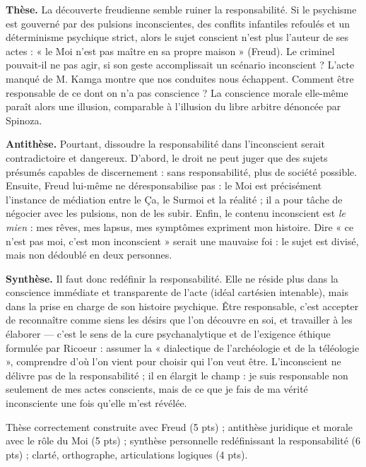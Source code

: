 \documentclass[11pt]{article}
\newcommand{\cle}[1]{{\popxbold\color{popdark}#1}}
\begin{document}
\begin{corrige}
\textbf{Thèse.} La découverte freudienne semble ruiner la responsabilité. Si le psychisme est gouverné par des pulsions inconscientes, des conflits infantiles refoulés et un déterminisme psychique strict, alors le sujet conscient n'est plus l'auteur de ses actes : « le Moi n'est pas maître en sa propre maison » (Freud). Le criminel pouvait-il ne pas agir, si son geste accomplissait un scénario inconscient ? L'acte manqué de M. Kamga montre que nos conduites nous échappent. Comment être responsable de ce dont on n'a pas conscience ? La conscience morale elle-même paraît alors une illusion, comparable à l'illusion du libre arbitre dénoncée par Spinoza.

\textbf{Antithèse.} Pourtant, dissoudre la responsabilité dans l'inconscient serait contradictoire et dangereux. D'abord, le droit ne peut juger que des sujets présumés capables de discernement : sans responsabilité, plus de société possible. Ensuite, Freud lui-même ne déresponsabilise pas : le \cle{Moi} est précisément l'instance de médiation entre le Ça, le Surmoi et la réalité ; il a pour tâche de négocier avec les pulsions, non de les subir. Enfin, le contenu inconscient est \emph{le mien} : mes rêves, mes lapsus, mes symptômes expriment mon histoire. Dire « ce n'est pas moi, c'est mon inconscient » serait une mauvaise foi : le sujet est divisé, mais non dédoublé en deux personnes.

\textbf{Synthèse.} Il faut donc redéfinir la responsabilité. Elle ne réside plus dans la conscience immédiate et transparente de l'acte (idéal cartésien intenable), mais dans la \cle{prise en charge} de son histoire psychique. Être responsable, c'est accepter de reconnaître comme siens les désirs que l'on découvre en soi, et travailler à les élaborer — c'est le sens de la cure psychanalytique et de l'exigence éthique formulée par Ricoeur : assumer la « dialectique de l'archéologie et de la téléologie », comprendre d'où l'on vient pour choisir qui l'on veut être. L'inconscient ne délivre pas de la responsabilité ; il en élargit le champ : je suis responsable non seulement de mes actes conscients, mais de ce que je fais de ma vérité inconsciente une fois qu'elle m'est révélée.
\end{corrige}

\begin{attention}
Thèse correctement construite avec Freud (5 pts) ; antithèse juridique et morale avec le rôle du Moi (5 pts) ; synthèse personnelle redéfinissant la responsabilité (6 pts) ; clarté, orthographe, articulations logiques (4 pts).
\end{attention}
\end{document}
